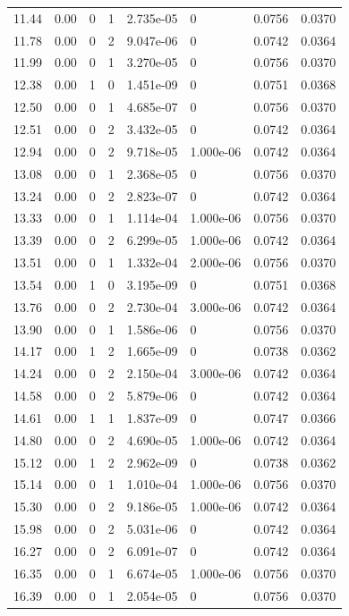 \documentclass[preview]{standalone}
\begin{document}
{{{\begin{tabular}{L{1.2cm}C{1.2cm} C{0.3cm}C{0.5cm} C{1.4cm}C{1.4cm} C{1.4cm}C{1.4cm}}
  11.44  &  0.00  & 0     &  1 &  2.735e-05  & 0  & 0.0756 &  0.0370   \\ 
  11.78  &  0.00  & 0     &  2 &  9.047e-06  & 0  & 0.0742 &  0.0364   \\ 
  11.99  &  0.00  & 0     &  1 &  3.270e-05  & 0  & 0.0756 &  0.0370   \\ 
  12.38  &  0.00  & 1     &  0 &  1.451e-09  & 0  & 0.0751 &  0.0368   \\ 
  12.50  &  0.00  & 0     &  1 &  4.685e-07  & 0  & 0.0756 &  0.0370   \\ 
  12.51  &  0.00  & 0     &  2 &  3.432e-05  & 0  & 0.0742 &  0.0364   \\ 
  12.94  &  0.00  & 0     &  2 &  9.718e-05  & 1.000e-06  & 0.0742 &  0.0364   \\ 
  13.08  &  0.00  & 0     &  1 &  2.368e-05  & 0  & 0.0756 &  0.0370   \\ 
  13.24  &  0.00  & 0     &  2 &  2.823e-07  & 0  & 0.0742 &  0.0364   \\ 
  13.33  &  0.00  & 0     &  1 &  1.114e-04  & 1.000e-06  & 0.0756 &  0.0370   \\ 
  13.39  &  0.00  & 0     &  2 &  6.299e-05  & 1.000e-06  & 0.0742 &  0.0364   \\ 
  13.51  &  0.00  & 0     &  1 &  1.332e-04  & 2.000e-06  & 0.0756 &  0.0370   \\ 
  13.54  &  0.00  & 1     &  0 &  3.195e-09  & 0  & 0.0751 &  0.0368   \\ 
  13.76  &  0.00  & 0     &  2 &  2.730e-04  & 3.000e-06  & 0.0742 &  0.0364   \\ 
  13.90  &  0.00  & 0     &  1 &  1.586e-06  & 0  & 0.0756 &  0.0370   \\ 
  14.17  &  0.00  & 1     &  2 &  1.665e-09  & 0  & 0.0738 &  0.0362   \\ 
  14.24  &  0.00  & 0     &  2 &  2.150e-04  & 3.000e-06  & 0.0742 &  0.0364   \\ 
  14.58  &  0.00  & 0     &  2 &  5.879e-06  & 0  & 0.0742 &  0.0364   \\ 
  14.61  &  0.00  & 1     &  1 &  1.837e-09  & 0  & 0.0747 &  0.0366   \\ 
  14.80  &  0.00  & 0     &  2 &  4.690e-05  & 1.000e-06  & 0.0742 &  0.0364   \\ 
  15.12  &  0.00  & 1     &  2 &  2.962e-09  & 0  & 0.0738 &  0.0362   \\ 
  15.14  &  0.00  & 0     &  1 &  1.010e-04  & 1.000e-06  & 0.0756 &  0.0370   \\ 
  15.30  &  0.00  & 0     &  2 &  9.186e-05  & 1.000e-06  & 0.0742 &  0.0364   \\ 
  15.98  &  0.00  & 0     &  2 &  5.031e-06  & 0  & 0.0742 &  0.0364   \\ 
  16.27  &  0.00  & 0     &  2 &  6.091e-07  & 0  & 0.0742 &  0.0364   \\ 
  16.35  &  0.00  & 0     &  1 &  6.674e-05  & 1.000e-06  & 0.0756 &  0.0370   \\ 
  16.39  &  0.00  & 0     &  1 &  2.054e-05  & 0  & 0.0756 &  0.0370   \\ 
\hline 
\end{tabular} 

}}}
\end{document}
